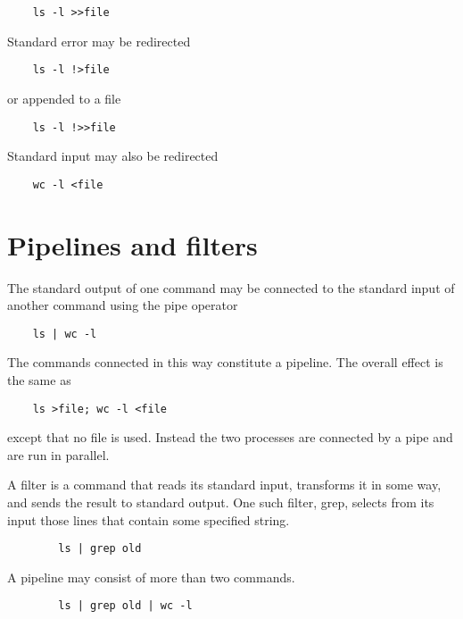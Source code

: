 \documentclass[12pt]{book}
\begin{document}
\begin{lstlisting}
	ls -l >>file
\end{lstlisting}

Standard error may be redirected

\begin{lstlisting}
	ls -l !>file
\end{lstlisting}

or appended to a file

\begin{lstlisting}
	ls -l !>>file
\end{lstlisting}

Standard input may also be redirected

\begin{lstlisting}
	wc -l <file
\end{lstlisting}


\section{Pipelines and filters}

The standard output of one command may be connected to the standard
input of another command using the pipe operator

\begin{lstlisting}
	ls | wc -l
\end{lstlisting}

The commands connected in this way constitute a pipeline. The
overall effect is the same as

\begin{lstlisting}
	ls >file; wc -l <file
\end{lstlisting}

except that no file is used. Instead the two processes are connected
by a pipe and are run in parallel.

A filter is a command that reads its standard input, transforms it
in some way, and sends the result to standard output. One such filter,
grep, selects from its input those lines that contain some specified
string. 

\begin{lstlisting}
		ls | grep old
\end{lstlisting}

A pipeline may consist of more than two commands.

\begin{lstlisting}
		ls | grep old | wc -l
\end{lstlisting}
\end{document}

